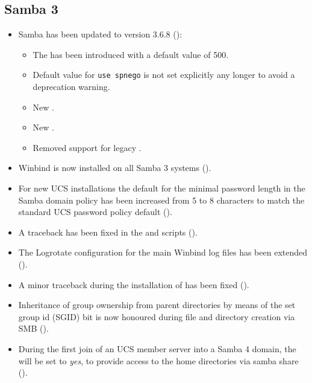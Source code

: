 \subsection{Samba 3}
\begin{itemize}
\item Samba has been updated to version 3.6.8 ():
	\begin{itemize}
	\item The  has been introduced
      with a default value of 500.
	\item Default value for \texttt{use spnego} is not set explicitly
      any longer to avoid a deprecation warning.
	\item New .
	\item New .
	\item Removed support for legacy .
	\end{itemize}
\item Winbind is now installed on all Samba 3 systems ().
\item For new UCS installations the default for the minimal password
  length in the Samba domain policy has been increased from 5 to 8 characters
  to match the standard UCS password policy default ().
\item A traceback has been fixed in the  and
   scripts ().
\item The Logrotate configuration for the main Winbind log files has
  been extended ().
\item A minor traceback during the installation of
   has been fixed
  ().
\item Inheritance of group ownership from parent directories by means
  of the set group id (SGID) bit is now honoured during file and
  directory creation via SMB ().
\item During the first join of an UCS member server into a Samba 4
  domain, the  will be set to \emph{yes}, to
  provide access to the home directories via samba share
  ().
\end{itemize}

